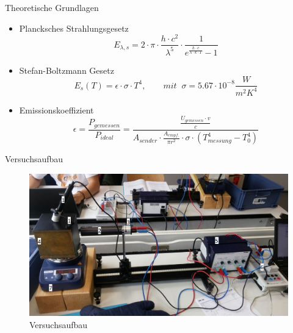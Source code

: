 \documentclass[12pt]{beamer}
\begin{document}
\begin{frame}{Theoretische Grundlagen}
\begin{itemize}
	\item{Plancksches Strahlungsgesetz}
	\begin{equation*}
	E_{\lambda,s}= 2 \cdot \pi \cdot \frac{h \cdot c^2}{\lambda^5} \cdot \frac{1}{e^{\frac{h\cdot c}{\lambda \cdot k \cdot T}}-1}
	\end{equation*}
	
	\item{Stefan-Boltzmann Gesetz}
	\begin{equation*}
	E_s(T)=\epsilon \cdot \sigma \cdot T^4,
	\qquad
	mit \;\; \sigma = 5.67 \cdot 10^{-8} \frac{W}{m^2K^4}
	\end{equation*}
	
	\item{Emissionskoeffizient}
	\begin{equation*} \label{eq:epsilon}
	\epsilon = \frac{P_{gemessen}}{P_{ideal}} = \frac{\frac{U_{gemessen} \cdot v}{c}}{A_{sender}\cdot \frac{A_{empf.}}{\pi r^2} \cdot \sigma \cdot (T_{messung}^4-T_0^4)}
	\end{equation*}
\end{itemize}
\end{frame}


\begin{frame}{Versuchsaufbau}
\begin{figure}[H]
	\includegraphics[scale=0.4]{../Protokoll/Bilder/Aufbau_markiert.png}
	\caption{Versuchsaufbau}
\end{figure}
\end{frame}
\end{document}
